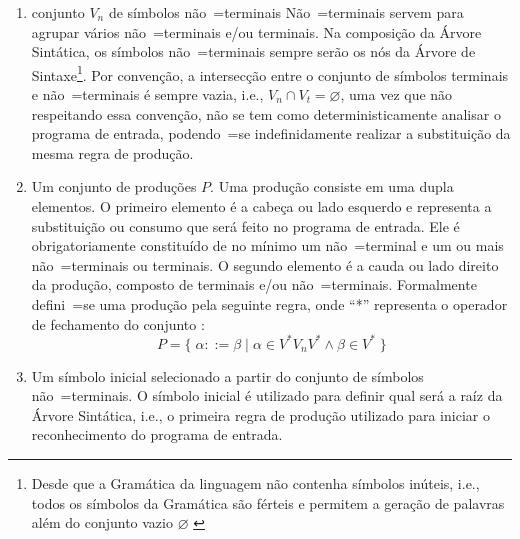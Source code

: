 {\begin{enumerate}
        \item {} conjunto $V_n$ de símbolos
        não~=terminais
        Não~=terminais servem para agrupar vários não~=terminais e\slash{}ou terminais.
        Na composição da Árvore Sintática,
        os símbolos não~=terminais sempre serão os nós da Árvore de Sintaxe\footnote{Desde que a Gramática da linguagem não contenha símbolos inúteis,
        i.e.,
        todos os símbolos da Gramática são férteis e
        permitem a geração de palavras além do conjunto vazio $\varnothing$ \cite{hopcroftBook}}.
        Por convenção,
        a intersecção entre o conjunto de símbolos terminais e
        não~=terminais é sempre vazia,
        i.e.,
        $V_n \cap V_t = \varnothing$,
        uma vez que não respeitando essa convenção,
        não se tem como deterministicamente analisar o programa de entrada,
        podendo~=se indefinidamente realizar a substituição da mesma regra de produção.

        \item \label{definicaoDeGramatica}Um conjunto de produções $P$.
        Uma produção consiste em uma dupla elementos.
        O primeiro elemento é a cabeça ou
        lado esquerdo e
        representa a substituição ou
        consumo que será feito no programa de entrada.
        Ele é obrigatoriamente constituído de no mínimo um não~=terminal e
        um ou mais não~=terminais ou
        terminais.
        O segundo elemento é a cauda ou
        lado direito da produção,
        composto de terminais e\slash{}ou não~=terminais.
        Formalmente defini~=se uma produção pela seguinte regra,
        onde ``*'' representa o operador de fechamento do conjunto \cite{hopcroftBook}:
        $$P = \{\; \alpha ::= \beta \;|\; \alpha \in V^* V_n V^* \land \beta \in V^* \;\}$$

        \item Um símbolo inicial selecionado a partir do conjunto de símbolos não~=terminais.
        O símbolo inicial é utilizado para definir qual será a raíz da Árvore Sintática,
        i.e.,
        o primeira regra de produção utilizado para iniciar o reconhecimento do programa de entrada.
    \end{enumerate}

}
